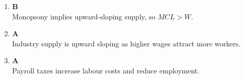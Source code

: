 \documentclass[12pt]{article}
\begin{document}
\begin{enumerate}
Answer A reflects the idea that:

\begin{quote}
A firm can reduce wages \textbf{without losing workers}, as long as wages remain above the reservation wage.
\end{quote}

This is the defining property of economic rents:
\begin{itemize}
    \item Firms have some flexibility to lower wages.
    \item Workers do not leave immediately because they are still better off than their next best alternative.
\end{itemize}

\subsection*{Why Answer D is Incorrect}

Answer D states that workers would leave if wages are reduced. This is incorrect because:

\begin{itemize}
    \item Workers only leave when:
    \[
    W < W^{R}
    \]
    \item A small wage reduction \textbf{within the rent margin} does not trigger exit.
\end{itemize}

Thus, Answer D ignores the key concept of a \textbf{reservation wage threshold}.

\subsection*{Conclusion}

\[
\boxed{
\text{Economic rents imply that wages can fall without reducing employment, as long as } W \geq W^{R}.
}
\]

Therefore, \textbf{Answer A is correct}.

\item \textbf{B} \\
Monopsony implies upward-sloping supply, so $MCL > W$.

\item \textbf{A} \\
Industry supply is upward sloping as higher wages attract more workers.

\item \textbf{A} \\
Payroll taxes increase labour costs and reduce employment.


\end{enumerate}
\end{document}
